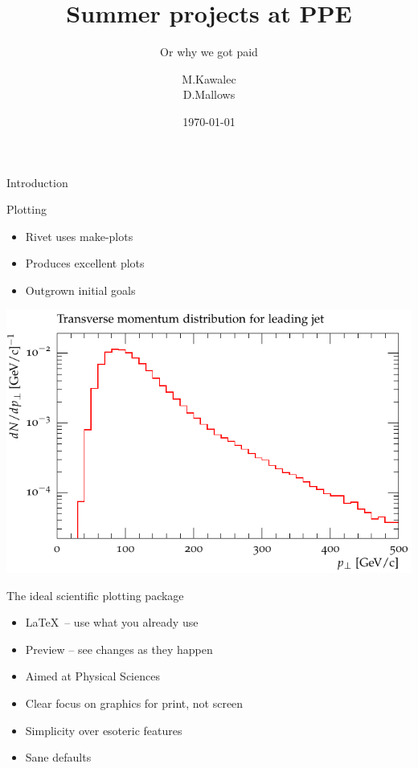 \documentclass{beamer}
\title{Summer projects at PPE}
\subtitle{Or why we got paid}
\author{M.Kawalec \\ D.Mallows}
\date{\today}
\begin{document}
  \frame{\titlepage}



  \begin{frame}{Introduction}


  \end{frame}

	
  \begin{frame}{Plotting}
    \begin{itemize}[<uncover@+>]
      \item Rivet uses make-plots
      \item Produces excellent plots
      \item Outgrown initial goals
    \end{itemize}
  \end{frame}
  \begin{frame}
    \includegraphics[width=\textwidth]{makeplots}
  \end{frame}

  \begin{frame}{The ideal scientific plotting package}
    \begin{itemize}[<uncover@+>]
      \item \LaTeX\ -- use what you already use
      \item Preview -- see changes as they happen
      \item Aimed at Physical Sciences
      \item Clear focus on graphics for print, not screen
      \item Simplicity over esoteric features
      \item Sane defaults
    \end{itemize}
  \end{frame}
\end{document}
